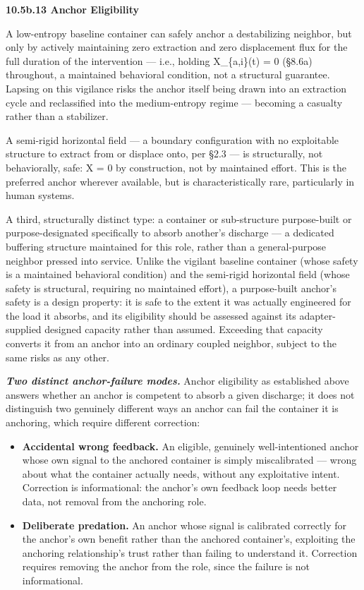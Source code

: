 \documentclass[
]{article}
\begin{document}
\textbf{10.5b.13 Anchor Eligibility}

A low-entropy baseline container can safely anchor a destabilizing
neighbor, but only by actively maintaining zero extraction and zero
displacement flux for the full duration of the intervention --- i.e.,
holding X\_\{a,i\}(t) = 0 (§8.6a) throughout, a maintained behavioral
condition, not a structural guarantee. Lapsing on this vigilance risks
the anchor itself being drawn into an extraction cycle and reclassified
into the medium-entropy regime --- becoming a casualty rather than a
stabilizer.

A semi-rigid horizontal field --- a boundary configuration with no
exploitable structure to extract from or displace onto, per §2.3 --- is
structurally, not behaviorally, safe: X = 0 by construction, not by
maintained effort. This is the preferred anchor wherever available, but
is characteristically rare, particularly in human systems.

A third, structurally distinct type: a container or sub-structure
purpose-built or purpose-designated specifically to absorb another's
discharge --- a dedicated buffering structure maintained for this role,
rather than a general-purpose neighbor pressed into service. Unlike the
vigilant baseline container (whose safety is a maintained behavioral
condition) and the semi-rigid horizontal field (whose safety is
structural, requiring no maintained effort), a purpose-built anchor's
safety is a design property: it is safe to the extent it was actually
engineered for the load it absorbs, and its eligibility should be
assessed against its adapter-supplied designed capacity rather than
assumed. Exceeding that capacity converts it from an anchor into an
ordinary coupled neighbor, subject to the same risks as any other.

\emph{\textbf{Two distinct anchor-failure modes.}} Anchor eligibility as
established above answers whether an anchor is competent to absorb a
given discharge; it does not distinguish two genuinely different ways an
anchor can fail the container it is anchoring, which require different
correction:

\begin{itemize}
\item
  \textbf{Accidental wrong feedback.} An eligible, genuinely
  well-intentioned anchor whose own signal to the anchored container is
  simply miscalibrated --- wrong about what the container actually
  needs, without any exploitative intent. Correction is informational:
  the anchor's own feedback loop needs better data, not removal from the
  anchoring role.
\item
  \textbf{Deliberate predation.} An anchor whose signal is calibrated
  correctly for the anchor's own benefit rather than the anchored
  container's, exploiting the anchoring relationship's trust rather than
  failing to understand it. Correction requires removing the anchor from
  the role, since the failure is not informational.
\end{itemize}
\end{document}
